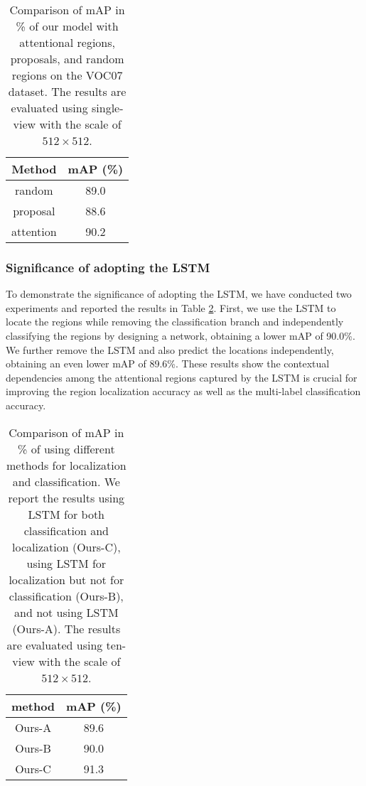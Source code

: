 \documentclass[letterpaper]{article} %
\begin{document}
\begin{table}[htp]
\centering
\begin{tabular}{c|c}
\hline
\centering Method & mAP (\%)  \\
\hline 
\hline
\centering random  & 89.0 \\
\centering proposal  & 88.6 \\
\centering attention & 90.2 \\
\hline
\end{tabular}
\caption{Comparison of mAP in \% of our model with attentional regions, proposals, and random regions on the VOC07 dataset. The results are evaluated using single-view with the scale of $512\times 512$.}
\label{table:attention}
\end{table}

\subsubsection{Significance of adopting the LSTM}
To demonstrate the significance of adopting the LSTM, we have conducted two experiments and reported the results in Table \ref{table:lstm}. First, we use the LSTM to locate the regions while removing the classification branch and independently classifying the regions by designing a network, obtaining a lower mAP of 90.0\%. We further remove the LSTM and also predict the locations independently, obtaining an even lower mAP of 89.6\%. These results show the contextual dependencies among the attentional regions captured by the LSTM is crucial for improving the region localization accuracy as well as the multi-label classification accuracy.

\begin{table}[htp]
\centering
\begin{tabular}{c|c}
\hline
\centering method  & mAP (\%) \\
\hline 
\hline
\centering Ours-A & 89.6  \\
\centering Ours-B  & 90.0  \\
\centering Ours-C & 91.3 \\
\hline
\end{tabular}
\caption{Comparison of mAP in \% of using different methods for localization and classification. We report the results using LSTM for both classification and localization (Ours-C), using LSTM for localization but not for classification (Ours-B), and not using LSTM (Ours-A). The results are evaluated using ten-view with the scale of $512\times 512$.}
\label{table:lstm}
\end{table}
\end{document}
